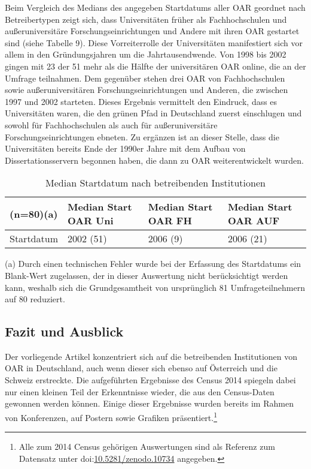 \documentclass[a4paper,
fontsize=11pt,
oneside,
numbers=noperiodatend,
parskip=half-,
bibliography=totoc,
final
]{scrartcl}
\begin{document}
Beim Vergleich des Medians des angegeben Startdatums aller OAR geordnet
nach Betreibertypen zeigt sich, dass Universitäten früher als
Fachhochschulen und außeruniversitäre Forschungseinrichtungen und Andere
mit ihren OAR gestartet sind (siehe Tabelle 9). Diese Vorreiterrolle der
Universitäten manifestiert sich vor allem in den Gründungsjahren um die
Jahrtausendwende. Von 1998 bis 2002 gingen mit 23 der 51 mehr als die
Hälfte der universitären OAR online, die an der Umfrage teilnahmen. Dem
gegenüber stehen drei OAR von Fachhochschulen sowie außeruniversitären
Forschungseinrichtungen und Anderen, die zwischen 1997 und 2002
starteten. Dieses Ergebnis vermittelt den Eindruck, dass es
Universitäten waren, die den grünen Pfad in Deutschland zuerst
einschlugen und sowohl für Fachhochschulen als auch für
außeruniversitäre Forschungseinrichtungen ebneten. Zu ergänzen ist an
dieser Stelle, dass die Universitäten bereits Ende der 1990er Jahre mit
dem Aufbau von Dissertationsservern begonnen haben, die dann zu OAR
weiterentwickelt wurden.

\begin{table}[ht]
\centering
\begin{tabular}{llll}
(n=80)(a) & Median Start OAR Uni & Median Start OAR FH & Median Start OAR AUF\\ 
  \hline
Startdatum & 2002 (51) & 2006 (9) & 2006 (21) \\ 
\end{tabular}
\caption{Median Startdatum nach betreibenden Institutionen}
\end{table}


(a) Durch einen technischen Fehler wurde bei der Erfassung des Startdatums
ein Blank-Wert zugelassen, der in dieser Auswertung nicht berücksichtigt
werden kann, weshalb sich die Grundgesamtheit von ursprünglich 81
Umfrageteilnehmern auf 80 reduziert.

\subsection*{Fazit und Ausblick}\label{fazit-und-ausblick}

Der vorliegende Artikel konzentriert sich auf die betreibenden
Institutionen von OAR in Deutschland, auch wenn dieser sich ebenso auf
Österreich und die Schweiz erstreckte. Die aufgeführten Ergebnisse des
Census 2014 spiegeln dabei nur einen kleinen Teil der Erkenntnisse
wieder, die aus den Census-Daten gewonnen werden können. Einige dieser
Ergebnisse wurden bereits im Rahmen von Konferenzen, auf Postern sowie
Grafiken präsentiert.\footnote{Alle zum 2014 Census gehörigen
  Auswertungen sind als Referenz zum Datensatz unter
  doi:\href{http://doi.org/10.5281/zenodo.10734}{10.5281/zenodo.10734}
  angegeben.}
\end{document}
